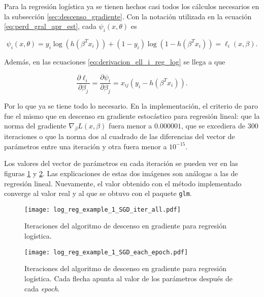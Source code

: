 
Para la regresión logística ya se tienen hechos casi todos los cálculos necesarios en la subsección \ref{sec:descenso_gradiente}. Con la notación utilizada en la ecuación \ref{eq:perd_gral_apr_est}, cada $\psi_i(x, \theta)$ es 

$$
  \psi_i(x, \theta) = y_i \log(h(\beta^T x_i)) + (1-y_i) \log(1-h(\beta^T x_i)) = \ell_i(x, \beta).
$$ 

Además, en las ecuaciones \ref{eq:derivacion_ell_i_reg_log} se llega a que

\[
  \frac{\partial \ell_i}{\partial \beta_j} = \frac{\partial \psi_i}{\partial \beta_j} = x_{ij}(y_i - h(\beta^T x_i)).
\]

Por lo que ya se tiene todo lo necesario. En la implementación, el criterio de paro fue el mismo que en descenso en gradiente estocástico para regresión lineal: que la norma del gradiente $\nabla_{\beta} L(x, \beta)$ fuera menor a $0.000001$, que se excediera de 300 iteraciones o que la norma dos al cuadrado de las diferencias del vector de parámetros entre una iteración y otra fuera menor a $10^{-15}$. 

Los valores del vector de parámetros en cada iteración se pueden ver en las figuras \ref{fig:log_reg_example_1_SGD_iter_all} y \ref{fig:log_reg_example_1_SGD_each_epoch}. Las explicaciones de estas dos imágenes son análogas a las de regresión lineal. Nuevamente, el valor obtenido con el método implementado converge al valor real y al que se obtuvo con el paquete \texttt{glm}.

\begin{figure}[H]
  \centering
  \texttt{[image: log\_reg\_example\_1\_SGD\_iter\_all.pdf]}
  \caption{Iteraciones del algoritmo de descenso en gradiente para regresión logística.}
  \label{fig:log_reg_example_1_SGD_iter_all}
\end{figure}


\begin{figure}[H]
  \centering
  \texttt{[image: log\_reg\_example\_1\_SGD\_each\_epoch.pdf]}
  \caption{Iteraciones del algoritmo de descenso en gradiente para regresión logística. Cada flecha apunta al valor de los parámetros después de cada \textit{epoch}.}
  \label{fig:log_reg_example_1_SGD_each_epoch}
\end{figure}





